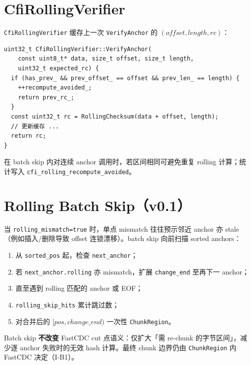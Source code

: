 \section{CfiRollingVerifier}
\label{sec:cfi-rolling}

\texttt{CfiRollingVerifier} 缓存上一次 \texttt{VerifyAnchor} 的 $(offset, length, rc)$：

\begin{lstlisting}[caption={CfiRollingVerifier::VerifyAnchor},label={lst:cfi-rolling}]
uint32_t CfiRollingVerifier::VerifyAnchor(
    const uint8_t* data, size_t offset, size_t length,
    uint32_t expected_rc) {
  if (has_prev_ && prev_offset_ == offset && prev_len_ == length) {
    ++recompute_avoided_;
    return prev_rc_;
  }
  const uint32_t rc = RollingChecksum(data + offset, length);
  // 更新缓存 ...
  return rc;
}
\end{lstlisting}

在 batch skip 内对连续 anchor 调用时，若区间相同可避免重复 rolling 计算；统计写入 \texttt{cfi\_rolling\_recompute\_avoided}。

\section{Rolling Batch Skip（v0.1）}
\label{sec:rolling-batch-skip}

当 \texttt{rolling\_mismatch=true} 时，单点 mismatch 往往预示邻近 anchor 亦 stale（例如插入/删除导致 offset 连锁漂移）。batch skip 向前扫描 sorted anchors：

\begin{enumerate}[nosep]
  \item 从 \texttt{sorted\_pos} 起，检查 \texttt{next\_anchor}；
  \item 若 \texttt{next\_anchor.rolling} 亦 mismatch，扩展 \texttt{change\_end} 至再下一 anchor；
  \item 直至遇到 rolling 匹配的 anchor 或 EOF；
  \item \texttt{rolling\_skip\_hits} 累计跳过数；
  \item 对合并后的 $[\mathit{pos}, \mathit{change\_end})$ 一次性 \texttt{ChunkRegion}。
\end{enumerate}

\begin{invariantbox}[边界不变性]
Batch skip \textbf{不改变} FastCDC cut 点语义：仅扩大「需 re-chunk 的字节区间」，减少逐 anchor 失败时的无效 hash 计算。最终 chunk 边界仍由 \texttt{ChunkRegion} 内 FastCDC 决定（I-B1）。
\end{invariantbox}

